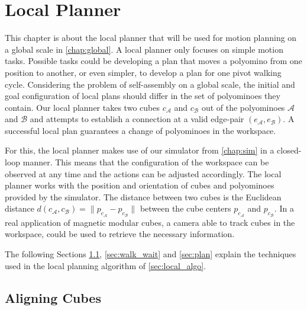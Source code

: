 \chapter{Local Planner}
\label{chap:local}

This chapter is about the local planner that will be used for motion planning on a global scale in \autoref{chap:global}.
A local planner only focuses on simple motion tasks.
Possible tasks could be developing a plan that moves a polyomino from one position to another, or even simpler, to develop a plan for one pivot walking cycle.
Considering the problem of self-assembly on a global scale, the initial and goal configuration of local plans should differ in the set of polyominoes they contain.
Our local planner takes two cubes $c_\mathcal{A}$ and $c_\mathcal{B}$ out of the polyominoes $\mathcal{A}$ and $\mathcal{B}$ and attempts to establish a connection at a valid edge-pair $(e_\mathcal{A}, e_\mathcal{B})$.
A successful local plan guarantees a change of polyominoes in the workspace.

For this, the local planner makes use of our simulator from \autoref{chap:sim} in a closed-loop manner.
This means that the configuration of the workspace can be observed at any time and the actions can be adjusted accordingly.
The local planner works with the position and orientation of cubes and polyominoes provided by the simulator.
The distance between two cubes is the Euclidean distance $d(c_\mathcal{A}, c_\mathcal{B}) = \lVert p_{c_{\mathcal{A}}} - p_{c_{\mathcal{B}}}\rVert$ between the cube centers $p_{c_\mathcal{A}}$ and $p_{c_\mathcal{B}}$.
In a real application of magnetic modular cubes, a camera able to track cubes in the workspace, could be used to retrieve the necessary information.

The following Sections \ref{sec:align}, \ref{sec:walk_wait} and \ref{sec:plan} explain the techniques used in the local planning algorithm of \autoref{sec:local_algo}.


\section{Aligning Cubes}
\label{sec:align}

